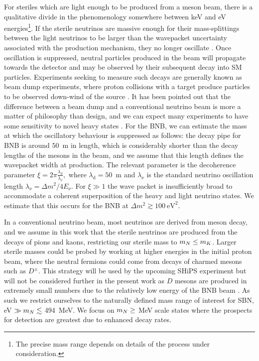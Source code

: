 \documentclass[11pt, a4paper]{article}
\def\ster{\ensuremath N}
\begin{document}
For steriles which are light enough to be produced from a meson beam, there is
a qualitative divide in the phenomenology somewhere between keV and eV
energies\footnote{The precise mass range depends on details of the process
under consideration.}. If the sterile neutrinos are massive enough for their
mass-splittings between the light neutrinos to be larger than the wavepacket
uncertainty associated with the production mechanism, they no longer oscillate
\cite{Akhmedov:2009rb}.  
%
Once oscillation is suppressed, neutral particles produced in the beam will
propagate towards the detector and may be observed by their subsequent decay
into SM particles. Experiments seeking to measure such decays are generally
known as beam dump experiments, where proton collisions with a target produce
particles to be observed down-wind of the source \cite{CooperSarkar:1985nh,
Bergsma:1985is, Vaitaitis:1999wq, Bernardi:1985ny, Bernardi:1987ek,
Anelli:2015pba, Alekhin:2015byh}. It has been pointed out that the difference
between a beam dump and a conventional neutrino beam is more a matter of
philosophy than design, and we can expect many experiments to have some
sensitivity to novel heavy states \cite{Gorbunov:2007ak, Asaka:2012bb,
Adams:2013qkq}. 
%
For the BNB, we can estimate the mass at which the oscillatory behaviour is
suppressed as follows: the decay pipe for BNB is around $50$~m in length, which
is considerably shorter than the decay lengths of the mesons in the beam, and
we assume that this length defines the wavepacket width at production.  The
relevant parameter is the decoherence parameter \cite{Akhmedov:2009rb,
Hernandez:2011rs}
%
$\xi = 2\pi \frac{\lambda_\text{d}}{\lambda_\nu},$
%
where $\lambda_\text{d} = 50$~m and $\lambda_\nu$ is the standard neutrino
oscillation length $\lambda_\nu = \Delta m^2/4E_\nu$. For $\xi\gg1$ the wave
packet is insufficiently broad to accommodate a coherent superposition of the
heavy and light neutrino states. We estimate that this occurs for the BNB at 
%
$ \Delta m^2 \gtrsim 100~\text{eV}^2.$
%

In a conventional neutrino beam, most neutrinos are derived from meson decay,
and we assume in this work that the sterile neutrinos are produced from the
decays of pions and kaons, restricting our sterile mass to $m_\ster \le m_K$.
%
Larger sterile masses could be probed by working at higher energies in the
initial proton beam, where the neutral fermions could come from decays of
charmed mesons such as $D^\pm$. This strategy will be used by the upcoming
SHiPS experiment \cite{Alekhin:2015byh, Anelli:2015pba} but will not be
considered further in the present work as $D$ mesons are produced in extremely
small numbers due to the relatively low energy of the BNB beam
\cite{AguilarArevalo:2008yp}. As such we restrict ourselves to the naturally
defined mass range of interest for SBN, eV $\gg m_\ster \lesssim$ 494~MeV.  We
focus on $m_\ster \geq$ MeV scale states where the prospects for detection are
greatest due to enhanced decay rates.
\end{document}
